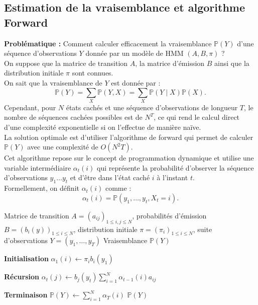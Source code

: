 \documentclass[11pt]{article}
\begin{document}

\subsection{Estimation de la vraisemblance et algorithme Forward}

\textbf{Problématique :}
Comment calculer efficacement la vraisemblance $\mathbb{P}(Y)$ d'une séquence d'observations $Y$ donnée par un modèle de HMM $(A, B, \pi)$ ? \\ 

On suppose que la matrice de transition $A$, la matrice d'émission $B$ ainsi que la distribution initiale $\pi$ sont connues. \\ 

On sait que la vraisemblance de $Y$ est donnée par :
\[
\mathbb{P}(Y) = \sum_{X}\mathbb{P}(Y,X) = \sum_{X}\mathbb{P}(Y \mid X)\mathbb{P}(X).
\]
Cependant, pour $N$ états cachés et une séquence d'observations de longueur $T$, le nombre de séquences cachées possibles est de $N^T$, ce qui rend le calcul direct d'une complexité exponentielle si on l'effectue de manière naïve. \\ 
La solution optimale est d'utiliser l'algorithme de forward qui permet de calculer $\mathbb{P}(Y)$ avec une complexité de $O(N^2T)$. \\ 

Cet algorithme repose sur le concept de programmation dynamique et utilise une variable intermédiaire $\alpha_t(i)$ qui représente la probabilité d'observer la séquence d'observations $y_1 \dots y_t$ et d'être dans l'état caché $i$ à l'instant $t$.\\
Formellement, on définit $\alpha_t(i)$ comme : 
\[
\alpha_t(i) = \mathbb{P}(y_1, \dots, y_t, X_t = i).
\]

\vspace{0.5cm}
\begin{algorithm}[H]
\caption{Algorithme Forward}
\label{alg:forward}
\begin{algorithmic}[1]
\Require Matrice de transition $A = (a_{ij})_{1 \leq i,j \leq N}$,
probabilités d'émission $B = (b_i(y))_{1 \leq i \leq N}$,
distribution initiale $\pi = (\pi_i)_{1 \leq i \leq N}$,
suite d'observations $Y = (y_1,\dots,y_T)$
\Ensure Vraisemblance $\mathbb{P}(Y)$

\Statex
\Statex \textbf{Initialisation}
    \State $\alpha_1(i) \gets \pi_i b_i(y_1)$
\EndFor

\Statex
\Statex \textbf{Récursion}
        \State $\displaystyle \alpha_t(j) \gets b_j(y_t)
        \sum_{i=1}^N \alpha_{t-1}(i)a_{ij}$
    \EndFor
\EndFor

\Statex
\Statex \textbf{Terminaison}
\State $\displaystyle \mathbb{P}(Y) \gets \sum_{i=1}^N \alpha_T(i)$
\State \Return $\mathbb{P}(Y)$

\end{algorithmic}
\end{algorithm}
\end{document}
